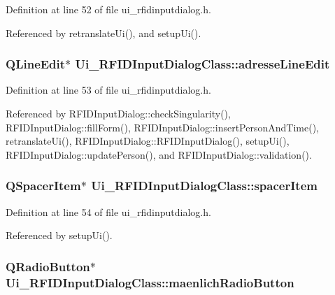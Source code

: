 Definition at line 52 of file ui\_\-rfidinputdialog.h.

Referenced by retranslateUi(), and setupUi().\hypertarget{class_ui___r_f_i_d_input_dialog_class_fcbdd99c7ed313b95eb96f49256ae8fd}{
\subsubsection[adresseLineEdit]{\setlength{\rightskip}{0pt plus 5cm}QLineEdit$\ast$ {\bf Ui\_\-RFIDInputDialogClass::adresseLineEdit}}}
\label{class_ui___r_f_i_d_input_dialog_class_fcbdd99c7ed313b95eb96f49256ae8fd}




Definition at line 53 of file ui\_\-rfidinputdialog.h.

Referenced by RFIDInputDialog::checkSingularity(), RFIDInputDialog::fillForm(), RFIDInputDialog::insertPersonAndTime(), retranslateUi(), RFIDInputDialog::RFIDInputDialog(), setupUi(), RFIDInputDialog::updatePerson(), and RFIDInputDialog::validation().\hypertarget{class_ui___r_f_i_d_input_dialog_class_7ec752b8c4dca22cfac4fbfe3be35923}{
\subsubsection[spacerItem]{\setlength{\rightskip}{0pt plus 5cm}QSpacerItem$\ast$ {\bf Ui\_\-RFIDInputDialogClass::spacerItem}}}
\label{class_ui___r_f_i_d_input_dialog_class_7ec752b8c4dca22cfac4fbfe3be35923}




Definition at line 54 of file ui\_\-rfidinputdialog.h.

Referenced by setupUi().\hypertarget{class_ui___r_f_i_d_input_dialog_class_522ea6b44f4494a26cfd4920252ff99f}{
\subsubsection[maenlichRadioButton]{\setlength{\rightskip}{0pt plus 5cm}QRadioButton$\ast$ {\bf Ui\_\-RFIDInputDialogClass::maenlichRadioButton}}}
\label{class_ui___r_f_i_d_input_dialog_class_522ea6b44f4494a26cfd4920252ff99f}





